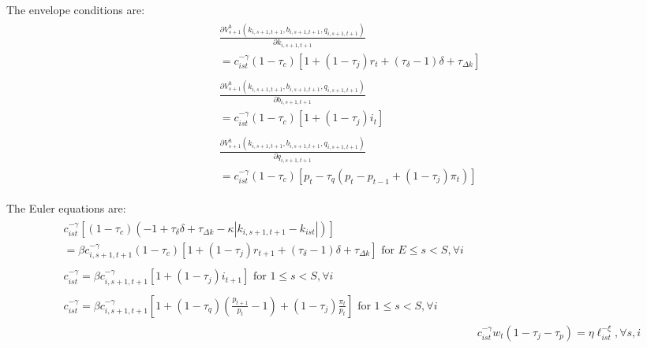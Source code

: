 \documentclass[letterpaper,12pt]{article}
\theoremstyle{definition}
\numberwithin{equation}{section}
\begin{document}
\begin{spacing}{1.5}
      The envelope conditions are:
      \begin{align}
      \begin{split}
      & \frac{\partial V^h_{s+1}(k_{i,s+1,t+1},b_{i,s+1,t+1},q_{i,s+1,t+1})}{\partial k_{i,s+1,t+1}} \\
      & = c_{ist}^{-\gamma}(1-\tau_c)\left[ 1 + (1-\tau_j)r_t + (\tau_\delta -1)\delta + \tau_{\Delta k} \right]
      \end{split} \nonumber \\  
      \begin{split}
      & \frac{\partial V^h_{s+1}(k_{i,s+1,t+1},b_{i,s+1,t+1},q_{i,s+1,t+1})}{\partial b_{i,s+1,t+1}} \\
      & = c_{ist}^{-\gamma}(1-\tau_c)\left[ 1+(1-\tau_j)i_t \right]
      \end{split} \nonumber \\
      \begin{split}
      &\frac{\partial V^h_{s+1}(k_{i,s+1,t+1},b_{i,s+1,t+1},q_{i,s+1,t+1})}{\partial q_{i,s+1,t+1}} \\
      & = c_{ist}^{-\gamma}(1-\tau_c)\left[ p_t - \tau_q(p_t-p_{t-1} + (1-\tau_j)\pi_t) \right]
      \end{split} \nonumber
      \end{align}

      The Euler equations are:
      \begin{align}
      \begin{split}
      & c_{ist}^{-\gamma}\left[(1-\tau_c)\left(-1+\tau_\delta \delta + \tau_{\Delta k} - \kappa \left|k_{i,s+1,t+1} - k_{ist} \right|\right)\right] \\
      & = \beta c_{i,s+1,t+1}^{-\gamma}(1-\tau_c)\left[ 1 + (1-\tau_j)r_{t+1} + (\tau_\delta -1)\delta + \tau_{\Delta k} \right] \text{     for } E\le s<S,\forall i
      \end{split} \label{Macro_CorpTax_Euler1}\\
      \begin{split}
      & c_{ist}^{-\gamma} = \beta c_{i,s+1,t+1}^{-\gamma} \left[ 1+(1-\tau_j)i_{t+1} \right] \text{     for } 1\le s<S,\forall i 
      \end{split} \label{Macro_CorpTax_Euler2}\\
      \begin{split}
      & c_{ist}^{-\gamma} = \beta c_{i,s+1,t+1}^{-\gamma}\left[ 1 + (1 - \tau_q)(\tfrac{p_{t+1}}{p_t}-1) + (1-\tau_j)\tfrac{\pi_t}{p_t} \right] \text{     for } 1\le s<S,\forall i 
      \end{split} \label{Macro_CorpTax_Euler3}\\
      & c_{ist}^{-\gamma} w_t(1-\tau_j - \tau_p) = \eta \ell_{ist}^{-\xi}, \forall s,i \label{Macro_CorpTax_Euler4}
      \end{align}


\end{spacing}
\end{document}
